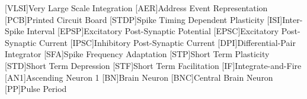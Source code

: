 [VLSI]{Very Large Scale Integration} 
[AER]{Address Event Representation}
[PCB]{Printed Circuit Board}
[STDP]{Spike Timing Dependent Plasticity}
[ISI]{Inter-Spike Interval}
[EPSP]{Excitatory Post-Synaptic Potential}
[EPSC]{Excitatory Post-Synaptic Current}
[IPSC]{Inhibitory Post-Synaptic Current}
[DPI]{Differential-Pair Integrator}
[SFA]{Spike Frequency Adaptation}
[STP]{Short Term Plasticity}
[STD]{Short Term Depression}
[STF]{Short Term Facilitation}
[IF]{Integrate-and-Fire}
[AN1]{Ascending Neuron 1}
[BN]{Brain Neuron}
[BNC]{Central Brain Neuron}
[PP]{Pulse Period}